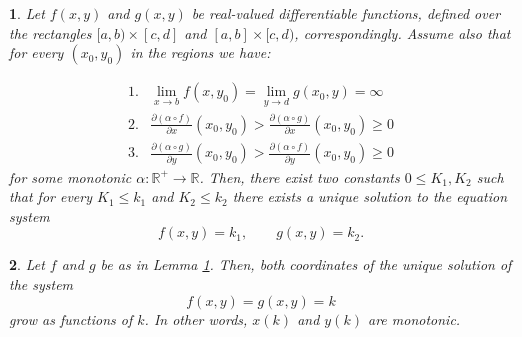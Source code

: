 \documentclass[10pt,a4paper]{amsart}
\newtheorem{lem}{}
\begin{document}
\begin{lem}
\label{lem:main}Let $f(x,y)$ and $g(x,y)$ be real-valued differentiable
functions, defined over the rectangles $[a,b)\times[c,d]$ and $[a,b]\times[c,d)$,
correspondingly. Assume also that for every $(x_{0},y_{0})$ in the
regions we have:

\begin{align*}
1. & \underset{x\to b}{\lim}f(x,y_{0})=\underset{y\to d}{\lim}g(x_{0},y)=\infty\\
2. & \frac{\partial(\alpha\circ f)}{\partial x}(x_{0},y_{0})>\frac{\partial(\alpha\circ g)}{\partial x}(x_{0},y_{0})\geq0\\
3. & \frac{\partial(\alpha\circ g)}{\partial y}(x_{0},y_{0})>\frac{\partial(\alpha\circ f)}{\partial y}(x_{0},y_{0})\geq0
\end{align*}
for some monotonic $\alpha:\mathbb{R}^{+}\to\mathbb{R}$. Then, there
exist two constants $0\leq K_{1},K_{2}$ such that for every $K_{1}\leq k_{1}$
and $K_{2}\leq k_{2}$ there exists a unique solution to the equation
system
\[
f(x,y)=k_{1},\qquad g(x,y)=k_{2}.
\]
\end{lem}

\begin{lem}
\label{lem:2}Let $f$ and $g$ be as in Lemma \ref{lem:main}. Then,
both coordinates of the unique solution of the system
\[
f(x,y)=g(x,y)=k
\]
grow as functions of $k$. In other words, $x(k)$ and $y(k)$ are
monotonic.
\end{lem}
\end{document}
